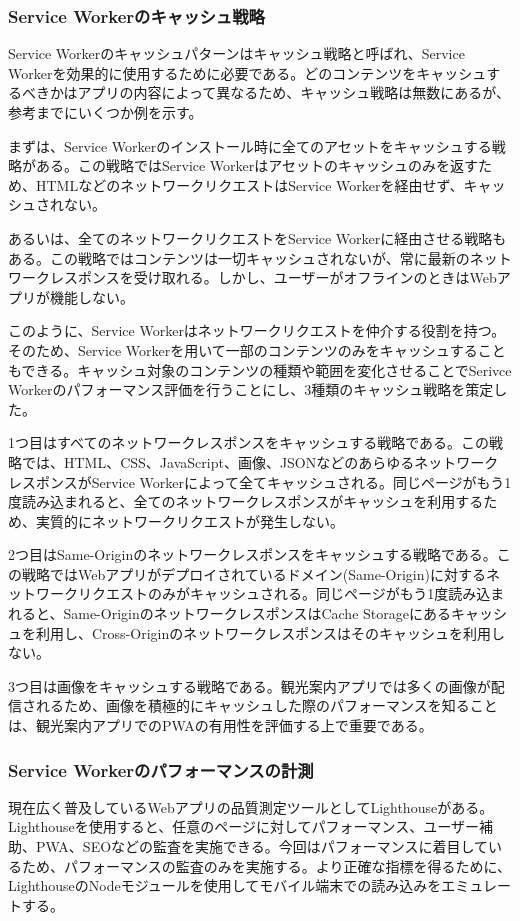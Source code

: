 \subsubsection{Service Workerのキャッシュ戦略}\label{Service Workerのキャッシュパターン}
Service Workerのキャッシュパターンはキャッシュ戦略と呼ばれ、Service Workerを効果的に使用するために必要である。どのコンテンツをキャッシュするべきかはアプリの内容によって異なるため、キャッシュ戦略は無数にあるが、参考までにいくつか例を示す。

まずは、Service Workerのインストール時に全てのアセットをキャッシュする戦略がある。この戦略ではService Workerはアセットのキャッシュのみを返すため、HTMLなどのネットワークリクエストはService Workerを経由せず、キャッシュされない。

あるいは、全てのネットワークリクエストをService Workerに経由させる戦略もある。この戦略ではコンテンツは一切キャッシュされないが、常に最新のネットワークレスポンスを受け取れる。しかし、ユーザーがオフラインのときはWebアプリが機能しない。

このように、Service Workerはネットワークリクエストを仲介する役割を持つ。そのため、Service Workerを用いて一部のコンテンツのみをキャッシュすることもできる。キャッシュ対象のコンテンツの種類や範囲を変化させることでSerivce Workerのパフォーマンス評価を行うことにし、3種類のキャッシュ戦略を策定した。

1つ目はすべてのネットワークレスポンスをキャッシュする戦略である。この戦略では、HTML、CSS、JavaScript、画像、JSONなどのあらゆるネットワークレスポンスがService Workerによって全てキャッシュされる。同じページがもう1度読み込まれると、全てのネットワークレスポンスがキャッシュを利用するため、実質的にネットワークリクエストが発生しない。

2つ目はSame-Originのネットワークレスポンスをキャッシュする戦略である。この戦略ではWebアプリがデプロイされているドメイン(Same-Origin)に対するネットワークリクエストのみがキャッシュされる。同じページがもう1度読み込まれると、Same-OriginのネットワークレスポンスはCache Storageにあるキャッシュを利用し、Cross-Originのネットワークレスポンスはそのキャッシュを利用しない。

3つ目は画像をキャッシュする戦略である。観光案内アプリでは多くの画像が配信されるため、画像を積極的にキャッシュした際のパフォーマンスを知ることは、観光案内アプリでのPWAの有用性を評価する上で重要である。
\subsubsection{Service Workerのパフォーマンスの計測}\label{subsubsection:Service Workerのパフォーマンスの計測}
現在広く普及しているWebアプリの品質測定ツールとしてLighthouseがある。Lighthouseを使用すると、任意のページに対してパフォーマンス、ユーザー補助、PWA、SEOなどの監査を実施できる。今回はパフォーマンスに着目しているため、パフォーマンスの監査のみを実施する。より正確な指標を得るために、LighthouseのNodeモジュールを使用してモバイル端末での読み込みをエミュレートする。


